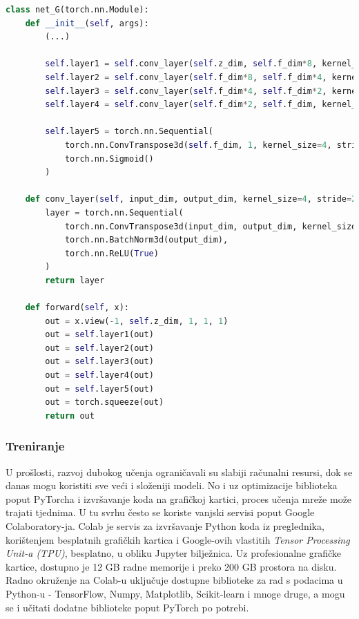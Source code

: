 \documentclass[times, utf8, diplomski]{fer}
\begin{document}
\break

\begin{lstlisting}[language=Python, caption=Modificirani 3DGAN model generatora]
class net_G(torch.nn.Module):
    def __init__(self, args):
        (...)

        self.layer1 = self.conv_layer(self.z_dim, self.f_dim*8, kernel_size=4, stride=2, padding=padd, bias=self.bias)
        self.layer2 = self.conv_layer(self.f_dim*8, self.f_dim*4, kernel_size=4, stride=2, padding=(1, 1, 1), bias=self.bias)
        self.layer3 = self.conv_layer(self.f_dim*4, self.f_dim*2, kernel_size=4, stride=2, padding=(1, 1, 1), bias=self.bias)
        self.layer4 = self.conv_layer(self.f_dim*2, self.f_dim, kernel_size=4, stride=2, padding=(1, 1, 1), bias=self.bias)
        
        self.layer5 = torch.nn.Sequential(
            torch.nn.ConvTranspose3d(self.f_dim, 1, kernel_size=4, stride=2, bias=self.bias, padding=(1, 1, 1)),
            torch.nn.Sigmoid()
        )

    def conv_layer(self, input_dim, output_dim, kernel_size=4, stride=2, padding=(1,1,1), bias=False):
        layer = torch.nn.Sequential(
            torch.nn.ConvTranspose3d(input_dim, output_dim, kernel_size=kernel_size, stride=stride, bias=bias, padding=padding),
            torch.nn.BatchNorm3d(output_dim),
            torch.nn.ReLU(True)
        )
        return layer

    def forward(self, x):
        out = x.view(-1, self.z_dim, 1, 1, 1)
        out = self.layer1(out)
        out = self.layer2(out)
        out = self.layer3(out)
        out = self.layer4(out)
        out = self.layer5(out)
        out = torch.squeeze(out)
        return out

\end{lstlisting}

\subsubsection{Treniranje}
U prošlosti, razvoj dubokog učenja ograničavali su slabiji računalni resursi, dok se danas mogu koristiti sve veći i složeniji modeli. No i uz optimizacije biblioteka poput PyTorcha i izvršavanje koda na grafičkoj kartici, proces učenja mreže može trajati tjednima. U tu svrhu često se koriste vanjski servisi poput Google Colaboratory-ja. Colab je servis za izvršavanje Python koda iz preglednika, korištenjem besplatnih grafičkih kartica i Google-ovih vlastitih \textit{Tensor Processing Unit-a (TPU)}, besplatno, u obliku Jupyter bilježnica. Uz profesionalne grafičke kartice, dostupno je 12 GB radne memorije i preko 200 GB prostora na disku. Radno okruženje na Colab-u uključuje dostupne biblioteke za rad s podacima u Python-u -  TensorFlow, Numpy, Matplotlib, Scikit-learn i mnoge druge, a mogu se i učitati dodatne biblioteke poput PyTorch po potrebi.
\end{document}
